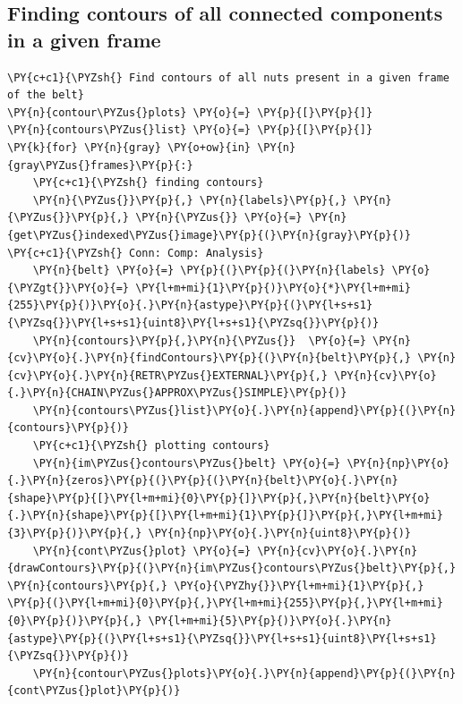 \documentclass[a4paper,11pt]{article}%
\begin{document}
\subsection{Finding contours of all connected components in a given frame}
    \begin{tcolorbox}[breakable, size=fbox, boxrule=1pt, pad at break*=1mm,colback=cellbackground, colframe=cellborder]
\begin{Verbatim}[commandchars=\\\{\}]
\PY{c+c1}{\PYZsh{} Find contours of all nuts present in a given frame of the belt}
\PY{n}{contour\PYZus{}plots} \PY{o}{=} \PY{p}{[}\PY{p}{]}
\PY{n}{contours\PYZus{}list} \PY{o}{=} \PY{p}{[}\PY{p}{]}
\PY{k}{for} \PY{n}{gray} \PY{o+ow}{in} \PY{n}{gray\PYZus{}frames}\PY{p}{:}
    \PY{c+c1}{\PYZsh{} finding contours}
    \PY{n}{\PYZus{}}\PY{p}{,} \PY{n}{labels}\PY{p}{,} \PY{n}{\PYZus{}}\PY{p}{,} \PY{n}{\PYZus{}} \PY{o}{=} \PY{n}{get\PYZus{}indexed\PYZus{}image}\PY{p}{(}\PY{n}{gray}\PY{p}{)} \PY{c+c1}{\PYZsh{} Conn: Comp: Analysis}
    \PY{n}{belt} \PY{o}{=} \PY{p}{(}\PY{p}{(}\PY{n}{labels} \PY{o}{\PYZgt{}}\PY{o}{=} \PY{l+m+mi}{1}\PY{p}{)}\PY{o}{*}\PY{l+m+mi}{255}\PY{p}{)}\PY{o}{.}\PY{n}{astype}\PY{p}{(}\PY{l+s+s1}{\PYZsq{}}\PY{l+s+s1}{uint8}\PY{l+s+s1}{\PYZsq{}}\PY{p}{)}
    \PY{n}{contours}\PY{p}{,}\PY{n}{\PYZus{}}  \PY{o}{=} \PY{n}{cv}\PY{o}{.}\PY{n}{findContours}\PY{p}{(}\PY{n}{belt}\PY{p}{,} \PY{n}{cv}\PY{o}{.}\PY{n}{RETR\PYZus{}EXTERNAL}\PY{p}{,} \PY{n}{cv}\PY{o}{.}\PY{n}{CHAIN\PYZus{}APPROX\PYZus{}SIMPLE}\PY{p}{)}
    \PY{n}{contours\PYZus{}list}\PY{o}{.}\PY{n}{append}\PY{p}{(}\PY{n}{contours}\PY{p}{)}
    \PY{c+c1}{\PYZsh{} plotting contours}
    \PY{n}{im\PYZus{}contours\PYZus{}belt} \PY{o}{=} \PY{n}{np}\PY{o}{.}\PY{n}{zeros}\PY{p}{(}\PY{p}{(}\PY{n}{belt}\PY{o}{.}\PY{n}{shape}\PY{p}{[}\PY{l+m+mi}{0}\PY{p}{]}\PY{p}{,}\PY{n}{belt}\PY{o}{.}\PY{n}{shape}\PY{p}{[}\PY{l+m+mi}{1}\PY{p}{]}\PY{p}{,}\PY{l+m+mi}{3}\PY{p}{)}\PY{p}{,} \PY{n}{np}\PY{o}{.}\PY{n}{uint8}\PY{p}{)}
    \PY{n}{cont\PYZus{}plot} \PY{o}{=} \PY{n}{cv}\PY{o}{.}\PY{n}{drawContours}\PY{p}{(}\PY{n}{im\PYZus{}contours\PYZus{}belt}\PY{p}{,} \PY{n}{contours}\PY{p}{,} \PY{o}{\PYZhy{}}\PY{l+m+mi}{1}\PY{p}{,} \PY{p}{(}\PY{l+m+mi}{0}\PY{p}{,}\PY{l+m+mi}{255}\PY{p}{,}\PY{l+m+mi}{0}\PY{p}{)}\PY{p}{,} \PY{l+m+mi}{5}\PY{p}{)}\PY{o}{.}\PY{n}{astype}\PY{p}{(}\PY{l+s+s1}{\PYZsq{}}\PY{l+s+s1}{uint8}\PY{l+s+s1}{\PYZsq{}}\PY{p}{)}
    \PY{n}{contour\PYZus{}plots}\PY{o}{.}\PY{n}{append}\PY{p}{(}\PY{n}{cont\PYZus{}plot}\PY{p}{)}
\end{Verbatim}
\end{tcolorbox}
\end{document}
